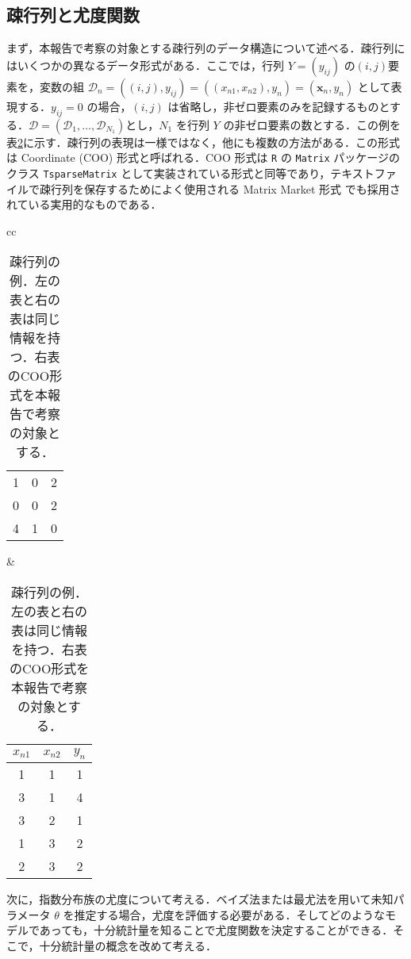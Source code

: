 \documentclass[paper=a4,10.5pt]{jsarticle} %
\numberwithin{equation}{section} %
\begin{document}
\subsection{疎行列と尤度関数}
\label{sec:sp}
まず，本報告で考察の対象とする疎行列のデータ構造について述べる．疎行列にはいくつかの異なるデータ形式がある．ここでは，行列 $Y=(y_{ij})$ の$(i,j)$要素を，変数の組 $\mathcal{D}_n = ( (i,j), y_{ij})=( (x_{n1}, x_{n2}), y_n)=(\boldsymbol{x}_{n}, y_n)$ として表現する．$y_{ij}=0$ の場合，$(i,j)$ は省略し，非ゼロ要素のみを記録するものとする．$\mathcal{D}=(\mathcal{D}_1, \ldots, \mathcal{D}_{N_1})$とし，$N_1$ を行列  $Y$ の非ゼロ要素の数とする．この例を表\ref{tab1}に示す．疎行列の表現は一様ではなく，他にも複数の方法がある．この形式は Coordinate (COO) 形式と呼ばれる．COO 形式は \texttt{R} の \texttt{Matrix} パッケージのクラス \texttt{TsparseMatrix} として実装されている形式と同等であり，テキストファイルで疎行列を保存するためによく使用される Matrix Market 形式 \citep{bates2024matrix} でも採用されている実用的なものである．


\begin{table}[bp]
\centering
\caption{疎行列の例．左の表と右の表は同じ情報を持つ．右表のCOO形式を本報告で考察の対象とする．}\label{tab1}
\begin{tabular}{cc}
\begin{minipage}{0.22\textwidth}
\centering
\begin{tabular}{|ccc|}
\hline
1 & 0 & 2\\
0 & 0 & 2\\
4 & 1 & 0\\
\hline
\end{tabular}
\end{minipage}
&
\begin{minipage}{0.22\textwidth}
\centering
\begin{tabular}{ccc}
\hline
$x_{n1}$ & $x_{n2}$ & $y_n$\\
\hline
1 & 1 & 1\\
3 & 1 & 4\\
3 & 2 & 1\\
1 & 3 & 2\\
2 & 3 & 2\\
\hline
\end{tabular}
\end{minipage}
\end{tabular}
\end{table}

次に，指数分布族の尤度について考える．ベイズ法または最尤法を用いて未知パラメータ $\theta$ を推定する場合，尤度を評価する必要がある．そしてどのようなモデルであっても，十分統計量を知ることで尤度関数を決定することができる．そこで，十分統計量の概念を改めて考える．
\end{document}
